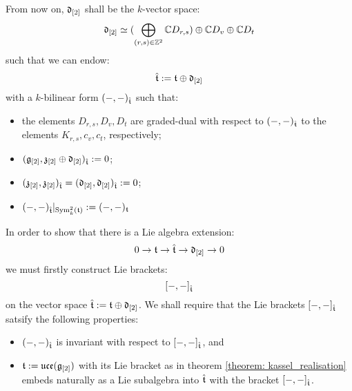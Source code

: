         \begin{convention} \label{conv: orthogonal_complement_of_toroidal_centres}
            From now on, $\mathfrak{d}_{[2]}$ shall be the $k$-vector space:
                $$\mathfrak{d}_{[2]} \simeq ( \bigoplus_{(r, s) \in \mathbb{Z}^2} \mathbb{C} D_{r, s} ) \oplus \mathbb{C} D_v \oplus \mathbb{C} D_t$$
            such that we can endow:
                $$\hat{\mathfrak{t}} := \mathfrak{t}\oplus \mathfrak{d}_{[2]}$$
            with a $k$-bilinear form $(-, -)_{\hat{\mathfrak{t}}}$ such that:
            \begin{itemize}
                \item the elements $D_{r, s}, D_v, D_t$ are graded-dual with respect to $(-, -)_{\hat{\mathfrak{t}}}$ to the elements $K_{r, s}, c_v, c_t$, respectively;
                \item $(\mathfrak{g}_{[2]}, \mathfrak{z}_{[2]} \oplus \mathfrak{d}_{[2]})_{\hat{\mathfrak{t}}} := 0$;
                \item $(\mathfrak{z}_{[2]}, \mathfrak{z}_{[2]})_{\hat{\mathfrak{t}}} = (\mathfrak{d}_{[2]}, \mathfrak{d}_{[2]})_{\hat{\mathfrak{t}}} := 0$;
                \item $(-, -)_{\hat{\mathfrak{t}}}|_{\mathrm{Sym}^2_k(\mathfrak{t})} := (-, -)_{\mathfrak{t}}$
            \end{itemize}
        \end{convention}

        In order to show that there is a Lie algebra extension:
            $$0 \to \mathfrak{t} \to \hat{\mathfrak{t}} \to \mathfrak{d}_{[2]} \to 0$$
        we must firstly construct Lie brackets:
            $$[-, -]_{\hat{\mathfrak{t}}}$$
        on the vector space $\hat{\mathfrak{t}} := \mathfrak{t} \oplus \mathfrak{d}_{[2]}$. We shall require that the Lie brackets $[-, -]_{\hat{\mathfrak{t}}}$ satsify the following properties:
        \begin{itemize}
            \item $(-, -)_{\hat{\mathfrak{t}}}$ is invariant with respect to $[-, -]_{\hat{\mathfrak{t}}}$, and
            \item $\mathfrak{t} := \mathfrak{uce}(\mathfrak{g}_{[2]})$ with its Lie bracket as in theorem \ref{theorem: kassel_realisation} embeds naturally as a Lie subalgebra into $\hat{\mathfrak{t}}$ with the bracket $[-, -]_{\hat{\mathfrak{t}}}$. 
        \end{itemize}

